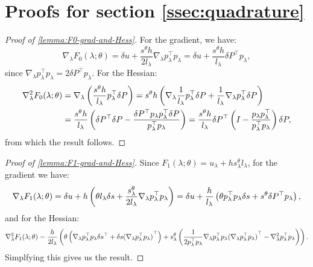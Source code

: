 \documentclass[eikonal.tex]{subfiles}
\begin{document}
\section{Proofs for section \ref{ssec:quadrature}}

\begin{proof}[Proof of \cref{lemma:F0-grad-and-Hess}]
  For the gradient, we have:
  \begin{equation*}
    \nabla_\lambda F_0(\lambda; \theta) = \delta u + \frac{s^{\theta} h}{2 l_\lambda} \nabla_\lambda p_\lambda^\top p_\lambda = \delta u + \frac{s^{\theta} h}{l_\lambda} \delta P^\top p_\lambda,
  \end{equation*}
  since
  $\nabla_\lambda p_\lambda^\top p_\lambda = 2 \delta P^\top
  p_\lambda$. For the Hessian:
  \begin{align*}
    \nabla^2_\lambda F_0(\lambda; \theta) &= \nabla_\lambda \left(\frac{s^{\theta} h}{l_\lambda} p_\lambda^\top \delta P\right) = s^{\theta} h \left(\nabla_\lambda \frac{1}{l_\lambda} p_\lambda^\top \delta P + \frac{1}{l_\lambda} \nabla_\lambda p_\lambda^\top \delta P\right) \\
    &= \frac{s^{\theta} h}{l_\lambda} \left(\delta P^\top \delta P - \frac{\delta P^\top p_\lambda p_\lambda^\top \delta P}{p_\lambda^\top p_\lambda}\right) = \frac{s^{\theta} h}{l_\lambda} \delta P^\top \left(I - \frac{p_\lambda p_\lambda^\top}{p_\lambda^\top p_\lambda}\right) \delta P,
  \end{align*}
  from which the result follows.
\end{proof}

\begin{proof}[Proof of \cref{lemma:F1-grad-and-Hess}]
  Since $F_1(\lambda; \theta) = u_\lambda + h s^{\theta}_\lambda l_\lambda$, for the gradient we have:
  \begin{equation*}
    \nabla_\lambda F_1(\lambda; \theta) = \delta u + h \left(\theta l_\lambda \delta s + \frac{s^{\theta}_\lambda}{2l_\lambda} \nabla_\lambda p_\lambda^\top p_\lambda\right) = \delta u + \frac{h}{l_\lambda} \left(\theta p_\lambda^\top p_\lambda \delta s + s^{\theta} \delta P^\top p_\lambda\right),
  \end{equation*}
  and for the Hessian:
  \begin{equation*}
    \nabla_\lambda^2 F_1(\lambda; \theta) = \frac{h}{2 l_\lambda} \left(\theta \left(\nabla_\lambda p_\lambda^\top p_\lambda \delta s^\top + \delta s {(\nabla_\lambda p_\lambda^\top p_\lambda)}^\top\right) + s^{\theta}_\lambda \left(\frac{1}{2 p_\lambda^\top p_\lambda} \nabla_\lambda p_\lambda^\top p_\lambda {(\nabla_\lambda p_\lambda^\top p_\lambda)}^\top - \nabla^2_\lambda p_\lambda^\top p_\lambda\right)\right).
  \end{equation*}
  Simplfying this gives us the result.
\end{proof}
\end{document}
